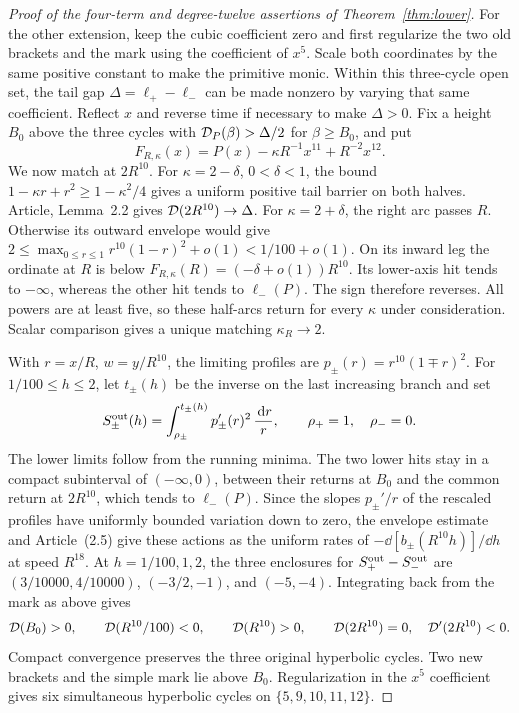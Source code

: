 \begin{proof}[Proof of the four-term and degree-twelve assertions of Theorem~\ref{thm:lower}]
For the other extension, keep the cubic coefficient zero and first
regularize the two old brackets and the mark using the coefficient of
$x^5$. Scale both coordinates by the same positive constant to make
the primitive monic. Within this three-cycle open set, the tail gap
$\Delta=\ell_+-\ell_-$ can be made nonzero by varying that same
coefficient. Reflect $x$ and reverse time if necessary to make $\Delta>0$.
Fix a height $B_0$ above the three cycles with $\mathcal{D}_P(\beta)>\Delta/2$
for $\beta\ge B_0$, and put
\[
 F_{R,\kappa}(x)=P(x)-\kappa R^{-1}x^{11}+R^{-2}x^{12}.
\]
We now match at $2R^{10}$. For $\kappa=2-\delta$, $0<\delta<1$,
the bound $1-\kappa r+r^2\ge1-\kappa^2/4$ gives a uniform positive
tail barrier on both halves. Article, Lemma~2.2 gives
$\mathcal{D}(2R^{10})\to\Delta$. For $\kappa=2+\delta$, the right arc
passes $R$. Otherwise its outward envelope would give
$2\le\max_{0\le r\le1}r^{10}(1-r)^2+o(1)<1/100+o(1)$.
On its inward leg the ordinate at $R$ is below
$F_{R,\kappa}(R)=(-\delta+o(1))R^{10}$. Its lower-axis hit tends
to $-\infty$, whereas the other hit tends to $\ell_-(P)$. The sign
therefore reverses. All powers are at least five, so these half-arcs
return for every $\kappa$ under consideration. Scalar comparison gives
a unique matching $\kappa_R\to2$.

With $r=x/R$, $w=y/R^{10}$, the limiting profiles are
$p_\pm(r)=r^{10}(1\mp r)^2$. For $1/100\le h\le2$, let $t_\pm(h)$
be the inverse on the last increasing branch and set
\[
 S_\pm^{\rm out}(h)=\int_{\rho_\pm}^{t_\pm(h)}
             p_\pm'(r)^2\,\frac{\,\mathrm{d} r}{r},\qquad \rho_+=1,\quad\rho_-=0 .
\]
The lower limits follow from the running minima. The two lower hits
stay in a compact subinterval of $(-\infty,0)$, between their returns
at $B_0$ and the common return at $2R^{10}$, which tends to $\ell_-(P)$.
Since the slopes $p_\pm'/r$ of the rescaled profiles have uniformly
bounded variation down to zero, the envelope estimate and
Article~(2.5) give these actions as the uniform rates of
$-\dd[b_\pm(R^{10}h)]/\dd h$ at speed $R^{18}$. At $h=1/100,1,2$,
the three enclosures for $S_+^{\rm out}-S_-^{\rm out}$ are
$(3/10000,4/10000)$, $(-3/2,-1)$, and $(-5,-4)$.
Integrating back from the mark as above gives
\[
 \mathcal{D}(B_0)>0,\qquad \mathcal{D}(R^{10}/100)<0,\qquad \mathcal{D}(R^{10})>0,
 \qquad \mathcal{D}(2R^{10})=0,\quad \mathcal{D}'(2R^{10})<0 .
\]
Compact convergence preserves the three original hyperbolic cycles.
Two new brackets and the simple mark lie above $B_0$. Regularization
in the $x^5$ coefficient gives six simultaneous hyperbolic cycles
on $\{5,9,10,11,12\}$.
\end{proof}
